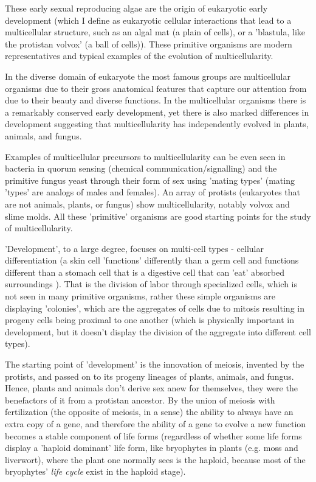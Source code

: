 These early sexual reproducing algae are the origin of eukaryotic early development (which I define as eukaryotic cellular interactions that lead to a multicellular structure, such as an algal mat (a plain of cells), or a 'blastula, like the protistan volvox' (a ball of cells)\cite{pmid7579526}).  These primitive organisms are modern representatives and typical examples of the evolution of multicellularity.  

In the diverse domain of eukaryote the most famous groups are multicellular organisms due to their gross anatomical features that capture our attention from due to their beauty and diverse functions.  In the multicellular organisms there is a remarkably conserved early development, yet there is also marked differences in development suggesting that multicellularity has independently evolved in plants, animals, and fungus.  

Examples of multicellular precursors to multicellularity can be even seen in bacteria in quorum sensing (chemical communication/signalling) and the primitive fungus yeast through their form of sex using 'mating types' (mating 'types' are analogs of males and females)\cite{pmid7579526}. An array of protists (eukaryotes that are not animals, plants, or fungus) show multicellularity, notably volvox and slime molds.  All these 'primitive' organisms are good starting points for the study of multicellularity. 

 'Development', to a large degree, focuses on multi-cell types - cellular differentiation (a skin cell 'functions' differently than a germ cell and functions different than a stomach cell that is a digestive cell that can 'eat' absorbed surroundings ).  That is the division of labor through specialized cells, which is not seen in many primitive organisms, rather these simple organisms are displaying 'colonies', which are the aggregates of cells due to mitosis resulting in progeny cells being proximal to one another (which is physically important in development, but it doesn't display the division of the aggregate into different cell types).

The starting point of 'development' is the innovation of meiosis, invented by the protists, and passed on to its progeny lineages of plants, animals, and fungus.  Hence, plants and animals don't derive sex anew for themselves, they were the benefactors of it from a protistan ancestor.  By the union of meiosis with fertilization (the opposite of meiosis, in a sense) the ability to always have an extra copy of a gene, and therefore the ability of a gene to evolve a new function becomes a stable component of life forms (regardless of whether some life forms display a 'haploid dominant' life form, like bryophytes in plants (e.g. moss and liverwort), where the plant one normally sees is the haploid, because most of the bryophytes' \textit{life cycle} exist in the haploid stage).


